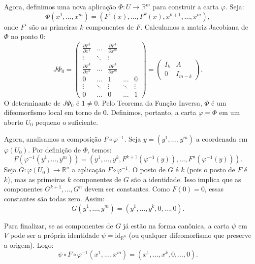 {	Agora, definimos uma nova aplicação $\Phi : U \to \mathbb{R}^m$ para construir a carta $\varphi$. Seja:
	\begin{equation*}
		\Phi(x^1, \dots, x^m) = (F^1(x), \dots, F^k(x), x^{k+1}, \dots, x^m),
	\end{equation*}
	onde $F^i$ são as primeiras $k$ componentes de $F$. Calculamos a matriz Jacobiana de $\Phi$ no ponto $0$:
	\begin{equation*}
		J\Phi_0 = \begin{pmatrix} 
			\tfrac{\partial F^1}{\partial x^1} & \dots & \tfrac{\partial F^1}{\partial x^m} \\ 
			\vdots & \ddots & \vdots \\ 
			\tfrac{\partial F^k}{\partial x^k} & \dots & \tfrac{\partial F^k}{\partial x^m} \\ 
			0 & \dots & 1 & \dots & 0 \\
			\vdots & \ddots & \vdots & \ddots & \vdots \\
			0 & \dots & 0 & \dots & 1
		\end{pmatrix} = \begin{pmatrix} 
			I_k & A \\ 
			0 & I_{m-k} 
		\end{pmatrix}.
	\end{equation*}
	O determinante de $J\Phi_0$ é $1 \neq 0$. Pelo Teorema da Função Inversa, $\Phi$ é um difeomorfismo local em torno de $0$. Definimos, portanto, a carta $\varphi = \Phi$ em um aberto $U_0$ pequeno o suficiente.
	
	Agora, analisamos a composição $F \circ \varphi^{-1}$. Seja $y = (y^1, \dots, y^m)$ a coordenada em $\varphi(U_0)$. Por definição de $\Phi$, temos:
	\begin{equation*}
		F(\varphi^{-1}(y^1, \dots, y^m)) = (y^1, \dots, y^k, F^{k+1}(\varphi^{-1}(y)), \dots, F^n(\varphi^{-1}(y))).
	\end{equation*}
	Seja $G : \varphi(U_0) \to \mathbb{R}^n$ a aplicação $F \circ \varphi^{-1}$. O posto de $G$ é $k$ (pois o posto de $F$ é $k$), mas as primeiras $k$ componentes de $G$ são a identidade. Isso implica que as componentes $G^{k+1}, \dots, G^n$ devem ser constantes. Como $F(0)=0$, essas constantes são todas zero. Assim:
	\begin{equation*}
		G(y^1, \dots, y^m) = (y^1, \dots, y^k, 0, \dots, 0).
	\end{equation*}
	
	Para finalizar, se as componentes de $G$ já estão na forma canônica, a carta $\psi$ em $V$ pode ser a própria identidade $\psi = \text{id}_{\mathbb{R}^n}$ (ou qualquer difeomorfismo que preserve a origem). Logo:
	\begin{equation*}
		\psi \circ F \circ \varphi^{-1}(x^1, \dots, x^m) = (x^1, \dots, x^k, 0, \dots, 0).
	\end{equation*}
}

